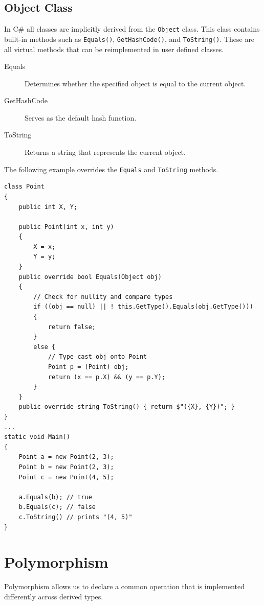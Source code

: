 \documentclass{article}
\begin{document}
\subsection{Object Class}
In C\# all classes are implicitly derived from the
\texttt{Object} class. This class contains built-in methods
such as \texttt{Equals()},
\texttt{GetHashCode()}, and
\texttt{ToString()}. These are all virtual methods that can
be reimplemented in user defined classes.
\begin{description}
    \item[Equals] Determines whether the specified object is equal to
          the current object.
    \item[GetHashCode] Serves as the default hash function.
    \item[ToString] Returns a string that represents the current
          object.
\end{description}
The following example overrides the \texttt{Equals} and \texttt{ToString} methods.
\begin{verbatim}
class Point
{
    public int X, Y;

    public Point(int x, int y)
    {
        X = x;
        Y = y;
    }
    public override bool Equals(Object obj)
    {
        // Check for nullity and compare types
        if ((obj == null) || ! this.GetType().Equals(obj.GetType()))
        {
            return false;
        }
        else {
            // Type cast obj onto Point
            Point p = (Point) obj;
            return (x == p.X) && (y == p.Y);
        }
    }
    public override string ToString() { return $"({X}, {Y})"; }
}
...
static void Main()
{
    Point a = new Point(2, 3);
    Point b = new Point(2, 3);
    Point c = new Point(4, 5);

    a.Equals(b); // true
    b.Equals(c); // false
    c.ToString() // prints "(4, 5)"
}
\end{verbatim}
\section{Polymorphism}
Polymorphism allows us to declare a common operation that is
implemented differently across derived types.
\end{document}
